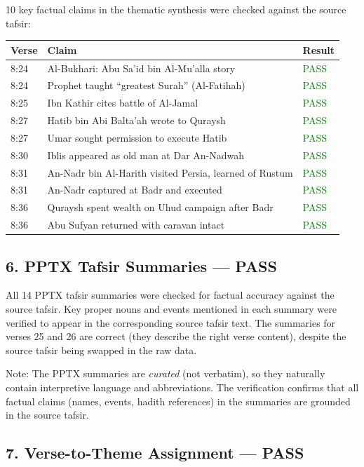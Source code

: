 \documentclass[11pt,a4paper]{article}
\begin{document}
10 key factual claims in the thematic synthesis were checked against the source tafsir:

\begin{tabular}{lll}
\toprule
\textbf{Verse} & \textbf{Claim} & \textbf{Result} \\
\midrule
8:24 & Al-Bukhari: Abu Sa'id bin Al-Mu'alla story & \textcolor{green}{PASS} \\
8:24 & Prophet taught ``greatest Surah'' (Al-Fatihah) & \textcolor{green}{PASS} \\
8:25 & Ibn Kathir cites battle of Al-Jamal & \textcolor{green}{PASS} \\
8:27 & Hatib bin Abi Balta'ah wrote to Quraysh & \textcolor{green}{PASS} \\
8:27 & Umar sought permission to execute Hatib & \textcolor{green}{PASS} \\
8:30 & Iblis appeared as old man at Dar An-Nadwah & \textcolor{green}{PASS} \\
8:31 & An-Nadr bin Al-Harith visited Persia, learned of Rustum & \textcolor{green}{PASS} \\
8:31 & An-Nadr captured at Badr and executed & \textcolor{green}{PASS} \\
8:36 & Quraysh spent wealth on Uhud campaign after Badr & \textcolor{green}{PASS} \\
8:36 & Abu Sufyan returned with caravan intact & \textcolor{green}{PASS} \\
\bottomrule
\end{tabular}

\subsection*{6. PPTX Tafsir Summaries --- PASS}

All 14 PPTX tafsir summaries were checked for factual accuracy against the source tafsir. Key proper nouns and events mentioned in each summary were verified to appear in the corresponding source tafsir text. The summaries for verses 25 and 26 are correct (they describe the right verse content), despite the source tafsir being swapped in the raw data.

Note: The PPTX summaries are \textit{curated} (not verbatim), so they naturally contain interpretive language and abbreviations. The verification confirms that all factual claims (names, events, hadith references) in the summaries are grounded in the source tafsir.

\subsection*{7. Verse-to-Theme Assignment --- PASS}
\end{document}
